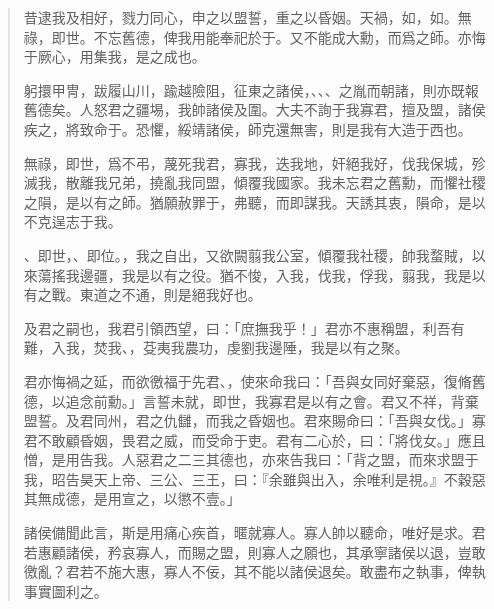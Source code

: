 \begin{quotation}昔逮我及相好，戮力同心，申之以盟誓，重之以昏姻。天禍，如，如。無祿，即世。不忘舊德，俾我用能奉祀於于。又不能成大勳，而爲之師。亦悔于厥心，用集我，是之成也。

躬擐甲冑，跋履山川，踰越險阻，征東之諸侯，、、、之胤而朝諸，則亦既報舊德矣。人怒君之疆埸，我帥諸侯及圍。大夫不詢于我寡君，擅及盟，諸侯疾之，將致命于。恐懼，綏靖諸侯，師克還無害，則是我有大造于西也。

無祿，即世，爲不弔，蔑死我君，寡我，迭我地，奸絕我好，伐我保城，殄滅我，散離我兄弟，撓亂我同盟，傾覆我國家。我未忘君之舊勳，而懼社稷之隕，是以有之師。猶願赦罪于，弗聽，而即謀我。天誘其衷，隕命，是以不克逞志于我。

、即世，、即位。，我之自出，又欲闕翦我公室，傾覆我社稷，帥我蝥賊，以來蕩搖我邊疆，我是以有之役。猶不悛，入我，伐我，俘我，翦我，我是以有之戰。東道之不通，則是絕我好也。

及君之嗣也，我君引領西望，曰：「庶撫我乎！」君亦不惠稱盟，利吾有難，入我，焚我、，芟夷我農功，虔劉我邊陲，我是以有之聚。

君亦悔禍之延，而欲徼福于先君、，使來命我曰：「吾與女同好棄惡，復脩舊德，以追念前勳。」言誓未就，即世，我寡君是以有之會。君又不祥，背棄盟誓。及君同州，君之仇讎，而我之昏姻也。君來賜命曰：「吾與女伐。」寡君不敢顧昏姻，畏君之威，而受命于吏。君有二心於，曰：「將伐女。」應且憎，是用告我。人惡君之二三其德也，亦來告我曰：「背之盟，而來求盟于我，昭告昊天上帝、三公、三王，曰：『余雖與出入，余唯利是視。』不穀惡其無成德，是用宣之，以懲不壹。」

諸侯備聞此言，斯是用痛心疾首，暱就寡人。寡人帥以聽命，唯好是求。君若惠顧諸侯，矜哀寡人，而賜之盟，則寡人之願也，其承寧諸侯以退，豈敢徼亂？君若不施大惠，寡人不佞，其不能以諸侯退矣。敢盡布之執事，俾執事實圖利之。
\end{quotation}

